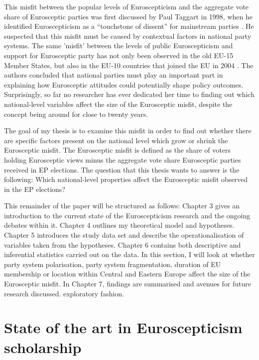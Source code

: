 This misfit between the popular levels of Euroscepticism and the aggregate vote share of Eurosceptic parties was first discussed by Paul Taggart in 1998, when he identified Euroscepticism as a “touchstone of dissent” for mainstream parties \cite[p.~366]{Taggart1998}. He suspected that this misfit must be caused by contextual factors in national party systems. The same 'misfit' between the levels of public Euroscepticism and support for Eurosceptic party has not only been observed in the old EU-15 Member States, but also in the EU-10 countries that joined the EU in 2004 \cite{Taggart2002}. The authors concluded that national parties must play an important part in explaining how Eurosceptic attitudes could potentially shape policy outcomes. Surprisingly, so far no researcher has ever dedicated her time to finding out which national-level variables affect the size of the Eurosceptic misfit, despite the concept being around for close to twenty years. 

The goal of my thesis is to examine this misfit in order to find out whether there are specific factors present on the national level which grow or shrink the Eurosceptic misfit. The Eurosceptic misfit is defined as the share of voters holding Eurosceptic views minus the aggregate vote share Eurosceptic parties received in EP elections. The question that this thesis wants to answer is the following: 
Which national-level properties affect the Eurosceptic misfit observed in the EP elections?

This remainder of the paper will be structured as follows: Chapter 3 gives an introduction to the current state of the Euroscepticism research and the ongoing debates within it. Chapter 4 outlines my theoretical model and hypotheses. Chapter 5 introduces the study data set and describe the operationalisation of variables taken from the hypotheses. Chapter 6 contains both descriptive and inferential statistics carried out on the data. In this section, I will look at whether party system polarisation, party system fragmentation, duration of EU membership or location within Central and Eastern Europe affect the size of the Eurosceptic misfit. In Chapter 7, findings are summarised and avenues for future research discussed. 
 exploratory fashion. 

\chapter{State of the art in Euroscepticism scholarship}

